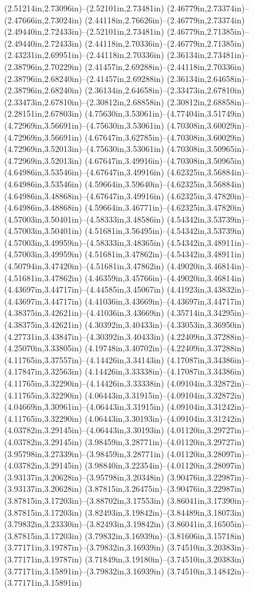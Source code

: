 (2.51214in,2.73096in)--(2.52101in,2.73481in) (2.46779in,2.73374in)--(2.47666in,2.73024in) (2.44118in,2.76626in)--(2.46779in,2.73374in) (2.49440in,2.72433in)--(2.52101in,2.73481in) (2.46779in,2.71385in)--(2.49440in,2.72433in) (2.44118in,2.70336in)--(2.46779in,2.71385in) (2.43231in,2.69951in)--(2.44118in,2.70336in) (2.36134in,2.73481in)--(2.38796in,2.70229in) (2.41457in,2.69288in)--(2.44118in,2.70336in) (2.38796in,2.68240in)--(2.41457in,2.69288in) (2.36134in,2.64658in)--(2.38796in,2.68240in) (2.36134in,2.64658in)--(2.33473in,2.67810in) (2.33473in,2.67810in)--(2.30812in,2.68858in) (2.30812in,2.68858in)--(2.28151in,2.67803in) (4.75630in,3.53061in)--(4.77404in,3.51749in) (4.72969in,3.56691in)--(4.75630in,3.53061in) (4.70308in,3.60029in)--(4.72969in,3.56691in) (4.67647in,3.62785in)--(4.70308in,3.60029in) (4.72969in,3.52013in)--(4.75630in,3.53061in) (4.70308in,3.50965in)--(4.72969in,3.52013in) (4.67647in,3.49916in)--(4.70308in,3.50965in) (4.64986in,3.53546in)--(4.67647in,3.49916in) (4.62325in,3.56884in)--(4.64986in,3.53546in) (4.59664in,3.59640in)--(4.62325in,3.56884in) (4.64986in,3.48868in)--(4.67647in,3.49916in) (4.62325in,3.47820in)--(4.64986in,3.48868in) (4.59664in,3.46771in)--(4.62325in,3.47820in) (4.57003in,3.50401in)--(4.58333in,3.48586in) (4.54342in,3.53739in)--(4.57003in,3.50401in) (4.51681in,3.56495in)--(4.54342in,3.53739in) (4.57003in,3.49959in)--(4.58333in,3.48365in) (4.54342in,3.48911in)--(4.57003in,3.49959in) (4.51681in,3.47862in)--(4.54342in,3.48911in) (4.50794in,3.47420in)--(4.51681in,3.47862in) (4.49020in,3.46814in)--(4.51681in,3.47862in) (4.46359in,3.45766in)--(4.49020in,3.46814in) (4.43697in,3.44717in)--(4.44585in,3.45067in) (4.41923in,3.43832in)--(4.43697in,3.44717in) (4.41036in,3.43669in)--(4.43697in,3.44717in) (4.38375in,3.42621in)--(4.41036in,3.43669in) (4.35714in,3.34295in)--(4.38375in,3.42621in) (4.30392in,3.40433in)--(4.33053in,3.36950in) (4.27731in,3.43847in)--(4.30392in,3.40433in) (4.22409in,3.37288in)--(4.25070in,3.33805in) (4.19748in,3.40702in)--(4.22409in,3.37288in) (4.11765in,3.37557in)--(4.14426in,3.34143in) (4.17087in,3.34386in)--(4.17847in,3.32563in) (4.14426in,3.33338in)--(4.17087in,3.34386in) (4.11765in,3.32290in)--(4.14426in,3.33338in) (4.09104in,3.32872in)--(4.11765in,3.32290in) (4.06443in,3.31915in)--(4.09104in,3.32872in) (4.04669in,3.30961in)--(4.06443in,3.31915in) (4.09104in,3.31242in)--(4.11765in,3.32290in) (4.06443in,3.30193in)--(4.09104in,3.31242in) (4.03782in,3.29145in)--(4.06443in,3.30193in) (4.01120in,3.29727in)--(4.03782in,3.29145in) (3.98459in,3.28771in)--(4.01120in,3.29727in) (3.95798in,3.27339in)--(3.98459in,3.28771in) (4.01120in,3.28097in)--(4.03782in,3.29145in) (3.98840in,3.22354in)--(4.01120in,3.28097in) (3.93137in,3.20628in)--(3.95798in,3.20348in) (3.90476in,3.22987in)--(3.93137in,3.20628in) (3.87815in,3.26475in)--(3.90476in,3.22987in) (3.87815in,3.17203in)--(3.88702in,3.17553in) (3.86041in,3.17390in)--(3.87815in,3.17203in) (3.82493in,3.19842in)--(3.84489in,3.18073in) (3.79832in,3.23330in)--(3.82493in,3.19842in) (3.86041in,3.16505in)--(3.87815in,3.17203in) (3.79832in,3.16939in)--(3.81606in,3.15718in) (3.77171in,3.19787in)--(3.79832in,3.16939in) (3.74510in,3.20383in)--(3.77171in,3.19787in) (3.71849in,3.19180in)--(3.74510in,3.20383in) (3.77171in,3.15891in)--(3.79832in,3.16939in) (3.74510in,3.14842in)--(3.77171in,3.15891in) 